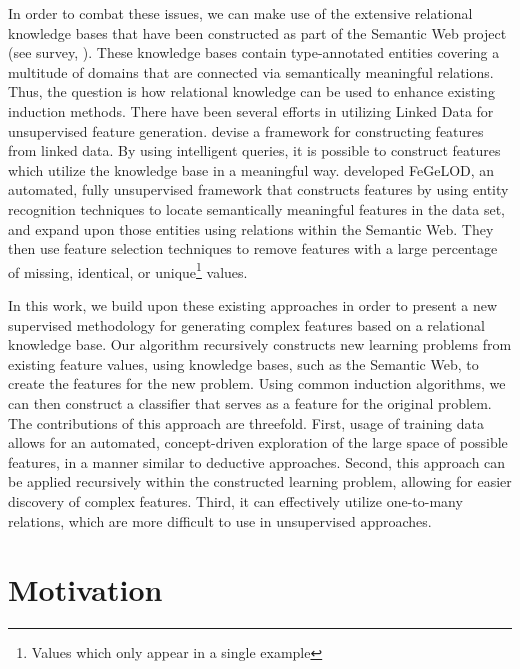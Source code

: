 \documentclass[twoside,11pt]{article}
\theoremstyle{definition}
\begin{document}
In order to combat these issues, we can make use of the extensive relational knowledge bases that have been constructed as part of the Semantic Web project (see survey, ). These knowledge bases contain type-annotated entities covering a multitude of domains that are connected via semantically meaningful relations. Thus, the question is how relational knowledge can be used to enhance existing induction methods.
There have been several efforts in utilizing Linked Data for unsupervised feature generation.  devise a framework for constructing features from linked data. By using intelligent queries, it is possible to construct features which utilize the knowledge base in a meaningful way. 
 developed FeGeLOD, an automated, fully unsupervised framework that constructs features by using entity recognition techniques to locate semantically meaningful features in the data set, and expand upon those entities using relations within the Semantic Web. They then use feature selection techniques to remove features with a large percentage of missing, identical, or unique\footnote{Values which only appear in a single example} values.

In this work, we build upon these existing approaches in order to present a new supervised methodology for generating complex features based on a relational knowledge base. Our algorithm recursively constructs new learning problems from existing feature values, using knowledge bases, such as the Semantic Web, to create the features for the new problem.
Using common induction algorithms, we can then construct a classifier that serves as a feature for the original problem. 
The contributions of this approach are threefold. First, usage of training data allows for an automated, concept-driven exploration of the large space of possible features, in a manner similar to deductive approaches. Second, this approach can be applied recursively within the constructed learning problem, allowing for easier discovery of complex features. Third, it can effectively utilize one-to-many relations, which are more difficult to use in unsupervised approaches.

\section{Motivation} \label{motivation}
\end{document}
